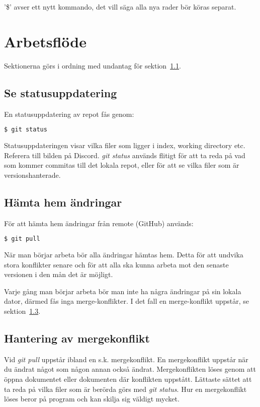 \documentclass[a4paper]{article}
\begin{document}
\clrpage

'\$' avser ett nytt kommando, det vill säga alla nya rader bör köras separat.

\section{Arbetsflöde}
Sektionerna görs i ordning med undantag för sektion~\ref{status}.

\subsection{Se statusuppdatering}
\label{status}
En statusuppdatering av repot fås genom:
\begin{lstlisting}[language=bash]
    $ git status
\end{lstlisting}

Statusuppdateringen visar vilka filer som ligger i index, working directory etc. Referera till bilden på Discord.
\emph{git status} används flitigt för att ta reda på vad som kommer commitas till det lokala repot, eller för att se vilka filer som är versionshanterade.

\subsection{Hämta hem ändringar}
För att hämta hem ändringar från remote (GitHub) används:
\begin{lstlisting}[language=bash]
    $ git pull
\end{lstlisting}
När man börjar arbeta bör alla ändringar hämtas hem.
Detta för att undvika stora konflikter senare och för att alla ska kunna arbeta mot den senaste versionen i den mån det är möjligt.

Varje gång man börjar arbeta bör man inte ha några ändringar på sin lokala dator, därmed fås inga merge-konflikter.
I det fall en merge-konflikt uppstår, se sektion~\ref{merge}.

\subsection{Hantering av mergekonflikt}
\label{merge}
Vid \emph{git pull} uppstår ibland en s.k. mergekonflikt.
En mergekonflikt uppstår när du ändrat något som någon annan också ändrat.
Mergekonflikten löses genom att öppna dokumentet eller dokumenten där konflikten uppstått.
Lättaste sättet att ta reda på vilka filer som är berörda görs med \emph{git status}.
Hur en mergekonflikt löses beror på program och kan skilja sig väldigt mycket.
\end{document}
